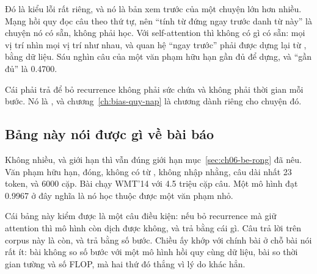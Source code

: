 Đó là kiểu lỗi rất riêng, và nó là bản xem trước của một chuyện lớn hơn nhiều.
Mạng hồi quy đọc câu theo thứ tự, nên \enquote{tính từ đứng ngay trước danh từ
này} là chuyện nó có sẵn, không phải học. Với self-attention thì không có gì có
sẵn: mọi vị trí nhìn mọi vị trí như nhau, và quan hệ \enquote{ngay trước} phải
được dựng lại từ , bằng dữ liệu. Sáu
nghìn câu của một văn phạm
hữu hạn gần đủ để dựng, và \enquote{gần đủ} là 0.4700.

Cái phải trả để bỏ recurrence không phải sức chứa và không phải thời gian mỗi
bước. Nó là , và
chương~\ref{ch:bias-quy-nap} là chương dành
riêng cho chuyện đó.

\subsection*{Bảng này nói được gì về bài báo}

%
Không nhiều, và giới hạn thì vẫn đúng giới hạn mục~\ref{sec:ch06-be-rong} đã
nêu. Văn phạm hữu hạn,  đóng, không có từ
, không nhập
nhằng, câu dài nhất 23 token, và 6000 cặp. Bài chạy WMT'14 với 4.5 triệu cặp
câu. Một mô hình đạt 0.9967 ở đây nghĩa là nó học thuộc được một văn phạm nhỏ.

Cái bảng này kiểm được là một câu điều kiện: nếu bỏ recurrence mà giữ attention
thì mô hình còn dịch được không, và trả bằng cái gì. Câu trả lời trên corpus
này là còn, và trả bằng số bước. Chiều ấy khớp với chính bài ở chỗ bài nói rất
ít: bài không so số bước với một mô hình hồi quy cùng dữ liệu, bài so thời gian
tường và số FLOP, mà hai thứ đó thắng vì lý do khác hẳn.

